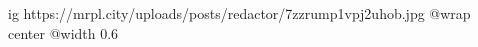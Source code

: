  
 
 
 
 

\ifcmt
  ig https://mrpl.city/uploads/posts/redactor/7zzrump1vpj2uhob.jpg
  @wrap center
  @width 0.6
\fi
